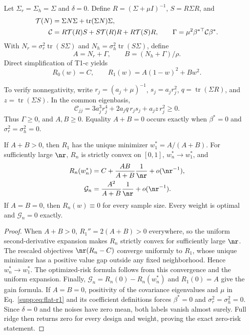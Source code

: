 Let $\Sigma_r=\Sigma_h=\Sigma$ and $\delta=0$. Define $R=(\Sigma+\mu I)^{-1}$, $S=R\Sigma R$, and
\begin{align}
 \mathcal T(N)&=\Sigma N\Sigma+\operatorname{tr}(\Sigma N)\Sigma,\notag\\
 \mathcal C&=R\mathcal T(R)S+S\mathcal T(R)R+R\mathcal T(S)R,\qquad
 \Gamma=\mu^2\beta^{*\top}\mathcal C\beta^*.
\end{align}
With $N_r=\sigma_r^2\operatorname{tr}(S\Sigma)$ and $N_h=\sigma_h^2\operatorname{tr}(S\Sigma)$, define
\begin{equation}
 A=N_r+\Gamma,\qquad B=(N_h+\Gamma)/\rho.
\end{equation}
Direct simplification of T1-c yields
\begin{equation}
 R_0(w)=C,\qquad R_1(w)=A(1-w)^2+Bw^2.
 \label{supp:eq:flat-r1}
\end{equation}

To verify nonnegativity, write $r_j=(a_j+\mu)^{-1}$, $s_j=a_jr_j^2$, $q=\operatorname{tr}(\Sigma R)$, and $z=\operatorname{tr}(\Sigma S)$. In the common eigenbasis,
\begin{equation}
 \mathcal C_{jj}=3a_j^3r_j^4+2a_jq\,r_js_j+a_jz\,r_j^2\ge0.
\end{equation}
Thus $\Gamma\ge0$, and $A,B\ge0$. Equality $A+B=0$ occurs exactly when $\beta^*=0$ and $\sigma_r^2=\sigma_h^2=0$.

\begin{theorem}\label{supp:thm:flat-r1}
If $A+B>0$, then $R_1$ has the unique minimizer $w_1^*=A/(A+B)$. For sufficiently large $\nr$, $R_n$ is strictly convex on $[0,1]$, $w_n^*\to w_1^*$, and
\begin{align}
 R_n(w_n^*)&=C+\frac{AB}{A+B}\frac1\nr+o(\nr^{-1}),\notag\\
 \mathcal G_n&=\frac{A^2}{A+B}\frac1\nr+o(\nr^{-1}).
\end{align}
If $A=B=0$, then $R_n(w)\equiv0$ for every sample size. Every weight is optimal and $\mathcal G_n=0$ exactly.
\end{theorem}

\begin{proof}
When $A+B>0$, $R_1''=2(A+B)>0$ everywhere, so the uniform second-derivative expansion makes $R_n$ strictly convex for sufficiently large $\nr$. The rescaled objectives $\nr(R_n-C)$ converge uniformly to $R_1$, whose unique minimizer has a positive value gap outside any fixed neighborhood. Hence $w_n^*\to w_1^*$. The optimized-risk formula follows from this convergence and the uniform expansion. Finally, $\mathcal G_n=R_n(0)-R_n(w_n^*)$ and $R_1(0)=A$ give the gain formula. If $A=B=0$, positivity of the covariance eigenvalues and $\mu$ in Eq.~\eqref{supp:eq:flat-r1} and its coefficient definitions forces $\beta^*=0$ and $\sigma_r^2=\sigma_h^2=0$. Since $\delta=0$ and the noises have zero mean, both labels vanish almost surely. Full ridge then returns zero for every design and weight, proving the exact zero-risk statement.
\end{proof}

